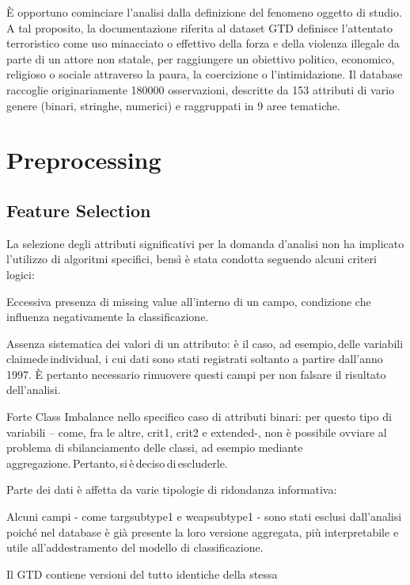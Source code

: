 \documentclass[fleqn,10pt]{SelfArx} %
\begin{document}
È opportuno cominciare l'analisi dalla definizione del fenomeno oggetto di studio. A tal proposito, la documentazione riferita al dataset GTD definisce l’attentato terroristico come uso minacciato o effettivo della forza e della violenza illegale da parte di un attore non statale, per raggiungere un obiettivo politico, economico, religioso o sociale attraverso la paura, la coercizione o l'intimidazione. Il database raccoglie originariamente 180000 osservazioni, descritte da 153 attributi di vario genere (binari, stringhe, numerici) e raggruppati in 9 aree tematiche.  



\section{Preprocessing}



\subsection{Feature Selection}
La selezione degli attributi significativi per la domanda d’analisi non ha implicato l’utilizzo di algoritmi specifici, bensì è stata condotta seguendo alcuni criteri logici:   

Eccessiva presenza di missing value all’interno di un campo, condizione che influenza negativamente la classificazione.   

Assenza sistematica dei valori di un attributo: è il caso, ad esempio, delle variabili claimede individual, i cui dati sono stati registrati soltanto a partire dall’anno 1997. È pertanto necessario rimuovere questi campi per non falsare il risultato dell’analisi.  

Forte Class Imbalance nello specifico caso di attributi binari: per questo tipo di variabili – come, fra le altre, crit1, crit2 e extended-, non è possibile ovviare al problema di sbilanciamento delle classi, ad esempio mediante aggregazione. Pertanto, si è deciso di escluderle.   

Parte dei dati è affetta da varie tipologie di ridondanza informativa:   

Alcuni campi - come targsubtype1 e weapsubtype1 - sono stati esclusi dall’analisi poiché nel database è già presente la loro versione aggregata, più interpretabile e utile all’addestramento del modello di classificazione.   

Il GTD contiene versioni del tutto identiche della stessa
\end{document}

